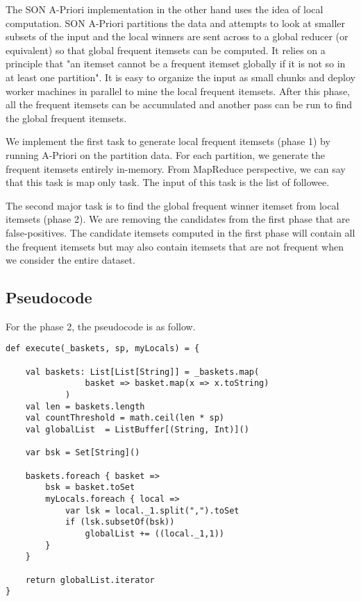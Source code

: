 \documentclass[11pt]{article}
\begin{document}
The SON A-Priori implementation in the other hand uses the idea of local computation.
SON A-Priori partitions the data and attempts to look at smaller subsets of the input and the local winners are sent across to a global reducer (or equivalent) so that global frequent itemsets can be computed.
It relies on a principle that "an itemset cannot be a frequent itemset globally if it is not so in at least one partition".
It is easy to organize the input as small chunks and deploy worker machines in parallel to mine the local frequent itemsets.
After this phase, all the frequent itemsets can be accumulated and another pass can be run to find the global frequent itemsets.

We implement the first task to generate local frequent itemsets (phase 1) by running A-Priori on the partition data.
For each partition, we generate the frequent itemsets entirely in-memory.
From MapReduce perspective, we can say that this task is map only task.
The input of this task is the list of followee.

The second major task is to find the global frequent winner itemset from local itemsets (phase 2).
We are removing the candidates from the first phase that are false-positives.
The candidate itemsets computed in the first phase will contain all the frequent itemsets but may also contain itemsets that are not frequent when we consider the entire dataset.

\subsection{Pseudocode}

For the phase 2, the pseudocode is as follow.

\begin{lstlisting}
def execute(_baskets, sp, myLocals) = {

    val baskets: List[List[String]] = _baskets.map(
                basket => basket.map(x => x.toString)
            )
    val len = baskets.length
    val countThreshold = math.ceil(len * sp)
    val globalList  = ListBuffer[(String, Int)]()

    var bsk = Set[String]()

    baskets.foreach { basket =>
        bsk = basket.toSet
        myLocals.foreach { local =>
            var lsk = local._1.split(",").toSet
            if (lsk.subsetOf(bsk))
                globalList += ((local._1,1))
        }
    }

    return globalList.iterator
}
\end{lstlisting}
\end{document}
